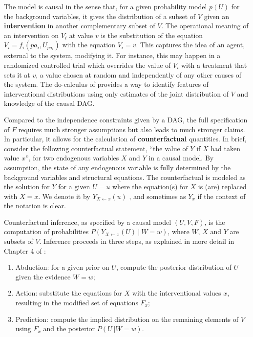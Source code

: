 The model is causal in the sense that, for a given probability model
$p(U)$ for the background variables, it gives the distribution of a
subset of $V$ given an {\bf intervention} in another complementary
subset of $V$.  The operational meaning of an intervention on $V_i$ at
value $v$ is the substitution of the equation
$V_i = f_i(pa_i, U_{pa_i})$ with the equation $V_i = v$. This captures
the idea of an agent, external to the system, modifying it. For
instance, this may happen in a randomized controlled trial which
overrides the value of $V_i$ with a treatment that sets it at $v$, a
value chosen at random and independently of any other causes of the
system. The do-calculus of \citet{pearl:00} provides a way to identify
features of interventional distributions %
using only estimates of the joint distribution of $V$ and knowledge of
the causal DAG.

Compared to the independence constraints given by a DAG, the full
specification of $F$ requires much stronger assumptions but also leads
to much stronger claims. In particular, it allows for the
calculation of {\bf counterfactual} quantities. %
In brief, consider the following counterfactual
statement, ``the value of $Y$ if $X$ had taken value $x$'', for two endogenous
variables $X$ and $Y$ in a causal model. By assumption, the state of
any endogenous variable is fully determined by
the background variables and structural equations. The counterfactual is
modeled as the solution for $Y$ for a given $U = u$ where the equation(s)
for $X$ is (are) replaced with $X = x$.  We denote it by $Y_{X \leftarrow x}(u)$
\cite{pearl:00}, and sometimes as $Y_x$ if the context of the notation is clear.

Counterfactual inference, as specified by a causal model $(U, V, F)$,
is the computation of probabilities
$P(Y_{X \leftarrow x}(U)\ |\ W = w)$, where $W$, $X$ and $Y$ are
subsets of $V$. Inference proceeds in three steps, as explained in
more detail in Chapter 4 of \citet{pearl:16}:
\begin{enumerate}
\item Abduction: for a given prior on $U$, compute the posterior
  distribution of $U$ given the evidence $W = w$;
\item Action: substitute the equations for $X$ with the interventional
  values $x$, resulting in the modified set of equations $F_x$;
\item Prediction: compute the implied distribution on the remaining
  elements of $V$ using $F_x$ and the posterior $P(U\ | W = w)$.
\end{enumerate}



